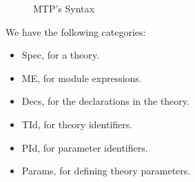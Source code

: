 \begin{figure}[t]
{\begin{tabular}{lll}
\end{tabular}
}
\caption{MTP's Syntax}
\label{fig:syntax}
\end{figure}

We have the following categories:
\begin{itemize}
\item
Spec, for a theory.

\item
ME, for module expressions.

\item
Decs, for the declarations in the theory.

\item
TId, for theory identifiers.

\item
PId, for parameter identifiers.

\item
Params, for defining theory parameters.
\end{itemize}



















